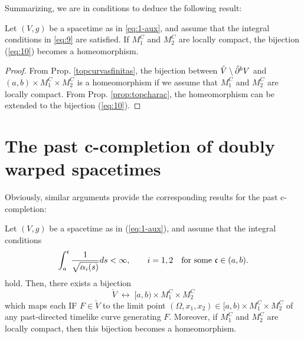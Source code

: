 \noindent Summarizing, we are in conditions to deduce the following result:

\begin{thm}\label{futurecomploneinfinite}
  Let $(V,g)$ be a  {\multiwarped} spacetime as in \eqref{eq:1-aux}, and assume that the integral conditions in \eqref{eq:9} are satisfied. If $M_1^C$ and $M_2^C$ are locally compact, the bijection (\ref{eq:10}) becomes a homeomorphism.
\end{thm}
\begin{proof}
  From Prop. \ref{topcurvasfinitas}, the bijection between $\hat{V}\setminus \hat{\partial}^{b} V$ and $(a,b) \times M_1^C\times M_2^C$ is a homeomorphism if we assume that $M_1^C$ and $M_2^C$ are locally compact. From Prop. \ref{prop:topcharac}, the homeomorphism can be extended to the bijection (\ref{eq:10}).
\end{proof}

\section{The past c-completion of doubly warped spacetimes}\label{ss6}

Obviously, similar arguments provide the corresponding results for the past c-completion:

\begin{thm}\label{pfuturestructurefiniteconditions}
  Let $(V,g)$ be a {\multiwarped} spacetime as in (\ref{eq:1-aux}), and assume that the integral conditions
  \begin{equation}
  \label{eqq:7}
  \int_{a}^{\mathfrak{c}}\frac{1}{\sqrt{\alpha_i(s)}}ds<\infty, \qquad \hbox{$i=1,2$}\quad\hbox{for some $\mathfrak{c}\in (a,b)$.}
\end{equation}
 hold. Then, there exists a bijection
  \begin{equation}
    \label{eqq:8}
    \check{V}\; \leftrightarrow \; [a,b) \times M_1^C\times M_2^C
  \end{equation}
  which maps each IF $F\in \check{V}$ to the limit point $(\Omega,x_1,x_2)\in [a,b)\times M_1^C\times M_2^C$ of any past-directed timelike curve generating $F$. Moreover, if $M_1^C$ and $M_2^C$ are locally compact, then this bijection becomes a homeomorphism.
\end{thm}


